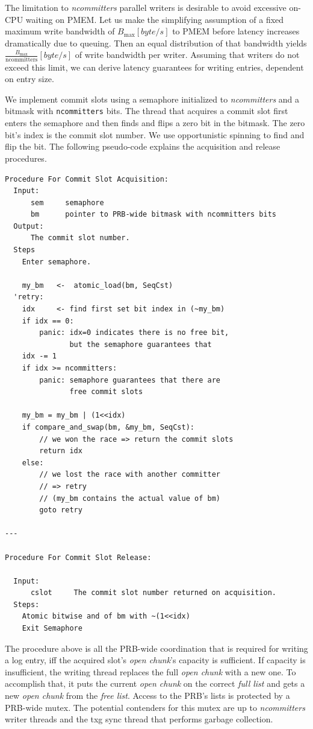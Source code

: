 \documentclass[12pt,a4paper,twoside]{book}
\begin{document}
{The limitation to \textit{ncommitters} parallel writers is desirable to avoid excessive on-CPU waiting on PMEM.
Let us make the simplifying assumption of a fixed maximum write bandwidth of $B_\text{max} [byte/s]$ to PMEM before latency increases dramatically due to queuing.
Then an equal distribution of that bandwidth yields $\frac{B_\text{max}}{\text{ncommitters}} [byte/s]$ of write bandwidth per writer.
Assuming that writers do not exceed this limit, we can derive latency guarantees for writing entries, dependent on entry size.

We implement commit slots using a semaphore initialized to \textit{ncommitters} and a bitmask with \lstinline{ncommitters} bits.
The thread that acquires a commit slot first enters the semaphore and then finds and flips a zero bit in the bitmask.
The zero bit's index is the commit slot number.
We use opportunistic spinning to find and flip the bit.
The following pseudo-code explains the acquisition and release procedures.

\begin{lstlisting}[style=figurepseudocode]
Procedure For Commit Slot Acquisition:
  Input:
      sem     semaphore
      bm      pointer to PRB-wide bitmask with ncommitters bits
  Output:
      The commit slot number.
  Steps
    Enter semaphore.

    my_bm   <-  atomic_load(bm, SeqCst)
  'retry:
    idx     <- find first set bit index in (~my_bm)
    if idx == 0:
        panic: idx=0 indicates there is no free bit,
               but the semaphore guarantees that
    idx -= 1
    if idx >= ncommitters:
        panic: semaphore guarantees that there are
               free commit slots

    my_bm = my_bm | (1<<idx)
    if compare_and_swap(bm, &my_bm, SeqCst):
        // we won the race => return the commit slots
        return idx
    else:
        // we lost the race with another committer
        // => retry
        // (my_bm contains the actual value of bm)
        goto retry

---

Procedure For Commit Slot Release:

  Input:
      cslot     The commit slot number returned on acquisition.
  Steps:
    Atomic bitwise and of bm with ~(1<<idx)
    Exit Semaphore
\end{lstlisting}

The procedure above is all the PRB-wide coordination that is required for writing a log entry, iff the acquired slot's \textit{open chunk}'s capacity is sufficient.
If capacity is insufficient, the writing thread replaces the full \textit{open chunk} with a new one.
To accomplish that, it puts the current \textit{open chunk} on the correct \textit{full list} and gets a new \textit{open chunk} from the \textit{free list}.
Access to the PRB's lists is protected by a PRB-wide mutex.
The potential contenders for this mutex are up to \textit{ncommitters} writer threads and the txg sync thread that performs garbage collection.

}
\end{document}
